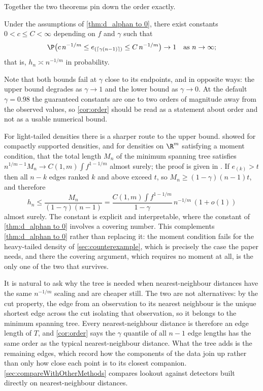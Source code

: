 Together the two theorems pin down the order exactly.

\begin{corollary}\label{cor:order}
  Under the assumptions of \cref{thm:d_alphan to 0}, there exist constants $0<c\leq C<\infty$ depending on $f$ and $\gamma$ such that
  $$
  \P\big(c\,n^{-1/m}\leq e_{(\lceil\gamma(n-1)\rceil)}\leq C\,n^{-1/m}\big)\to 1 \quad\text{as } n\to\infty;
  $$
  that is, $h_n \asymp n^{-1/m}$ in probability.
\end{corollary}

Note that both bounds fail at $\gamma$ close to its endpoints, and in opposite ways: the upper bound degrades as $\gamma\to1$ and the lower bound as $\gamma\to0$. At the default $\gamma=0.98$ the guaranteed constants are one to two orders of magnitude away from the observed values, so \cref{cor:order} should be read as a statement about order and not as a usable numerical bound.

\begin{remark}\label{rem:steele}
  For light-tailed densities there is a sharper route to the upper bound. \citet{Steele1988} showed for compactly supported densities, and \citet[Theorem 1.1]{PenroseYukich2003} for densities on $\R^m$ satisfying a moment condition, that the total length $M_n$ of the minimum spanning tree satisfies $n^{1/m-1}M_n\to C(1,m)\int f^{1-1/m}$ almost surely; the proof is given in \citet{Yukich1998}. If $e_{(k)}>t$ then all $n-k$ edges ranked $k$ and above exceed $t$, so $M_n\geq(1-\gamma)(n-1)t$, and therefore
  $$
  h_n \leq \frac{M_n}{(1-\gamma)(n-1)} = \frac{C(1,m)\int f^{1-1/m}}{1-\gamma}\,n^{-1/m}\,(1+o(1))
  $$
  almost surely. The constant is explicit and interpretable, where the constant of \cref{thm:d_alphan to 0} involves a covering number. This complements \cref{thm:d_alphan to 0} rather than replacing it: the moment condition fails for the heavy-tailed density of \cref{sec:counterexample}, which is precisely the case the paper needs, and there the covering argument, which requires no moment at all, is the only one of the two that survives.
\end{remark}

\begin{remark}\label{rem:nn}
  It is natural to ask why the tree is needed when nearest-neighbour distances have the same $n^{-1/m}$ scaling and are cheaper still. The two are not alternatives: by the cut property, the edge from an observation to its nearest neighbour is the unique shortest edge across the cut isolating that observation, so it belongs to the minimum spanning tree. Every nearest-neighbour distance is therefore an edge length of $T$, and \cref{cor:order} says the $\gamma$ quantile of all $n-1$ edge lengths has the same order as the typical nearest-neighbour distance. What the tree adds is the remaining edges, which record how the components of the data join up rather than only how close each point is to its closest companion. \cref{sec:compareWithOtherMethods} compares lookout against detectors built directly on nearest-neighbour distances.
\end{remark}

